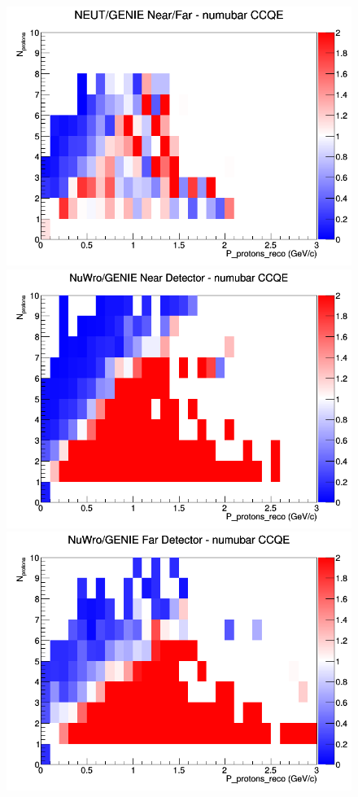 \begin{figure}[h]
\endminipage
{}
\includegraphics[width=\linewidth]{eff_N_P/GAr/protons/ratios/CCQE_NEUT_GENIE_numubar_NF_N_P.png}
\endminipage
\newline
{}
\includegraphics[width=\linewidth]{eff_N_P/GAr/protons/ratios/CCQE_NuWro_GENIE_numubar_near_N_P.png}
\endminipage
{}
\includegraphics[width=\linewidth]{eff_N_P/GAr/protons/ratios/CCQE_NuWro_GENIE_numubar_far_N_P.png}

\end{figure}
